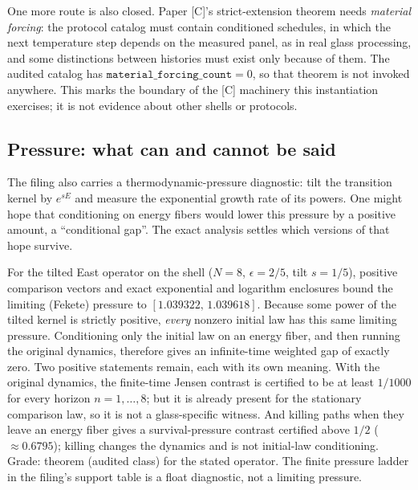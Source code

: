 

One more route is also closed. Paper [C]'s strict-extension theorem needs \emph{material forcing}:
the protocol catalog must contain conditioned schedules, in which the next temperature step depends
on the measured panel, as in real glass processing, and some distinctions between histories must
exist only because of them. The audited catalog has
$\texttt{material\_forcing\_count} = 0$, so that theorem is not invoked anywhere. This marks the
boundary of the [C] machinery this instantiation exercises; it is not evidence about other shells
or protocols.

\subsection{Pressure: what can and cannot be said}

The filing also carries a thermodynamic-pressure diagnostic: tilt the transition kernel by
$e^{s E}$ and measure the exponential growth rate of its powers. One might hope that conditioning
on energy fibers would lower this pressure by a positive amount, a ``conditional gap''. The
exact analysis settles which versions of that hope survive.

For the tilted East operator on the shell ($N=8$, $\epsilon=2/5$, tilt $s=1/5$), positive
comparison vectors and exact exponential and logarithm enclosures bound the limiting (Fekete)
pressure to $[1.039322,\, 1.039618]$. Because some power of the tilted kernel is strictly
positive, \emph{every} nonzero initial law has this same limiting pressure. Conditioning only the
initial law on an energy fiber, and then running the original dynamics, therefore gives an
infinite-time weighted gap of exactly zero. Two positive statements remain, each with its own
meaning. With the original dynamics, the finite-time Jensen contrast is certified to be at least
$1/1000$ for every horizon $n = 1, \ldots, 8$; but it is already present for the stationary
comparison law, so it is not a glass-specific witness. And killing paths when they leave an energy
fiber gives a survival-pressure contrast certified above $1/2$ ($\approx 0.6795$); killing changes
the dynamics and is not initial-law conditioning. Grade: theorem (audited class) for the stated
operator. The finite pressure ladder in the filing's support table is a float diagnostic, not a
limiting pressure.

